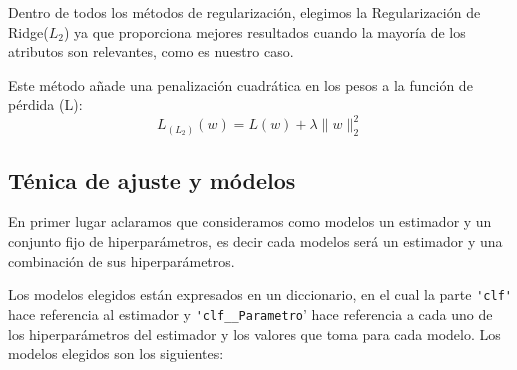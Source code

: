\documentclass[size=a4, parskip=half, titlepage=false, toc=flat, toc=bib, 12pt]{scrartcl}
\begin{document}
Dentro de todos los métodos de regularización, elegimos la Regularización de Ridge($L_2$) ya que proporciona mejores resultados cuando la mayoría de los atributos son relevantes, como es nuestro caso.

Este método añade una penalización cuadrática en los pesos a la función de pérdida (L):
$$L_{(L_2)}(w) = L(w) + \lambda \|w\|_2^2 $$

\subsection{Ténica de ajuste y módelos}

En primer lugar aclaramos que consideramos como modelos un estimador y un conjunto fijo de hiperparámetros, es decir cada modelos será un estimador y una combinación de sus hiperparámetros.

Los modelos elegidos están expresados en un diccionario, en el cual la parte \verb|'clf'| hace referencia al estimador y \verb|'clf__Parametro|' hace referencia a cada uno de los hiperparámetros del estimador y los valores que toma para cada modelo. Los modelos elegidos son los siguientes:
\end{document}
